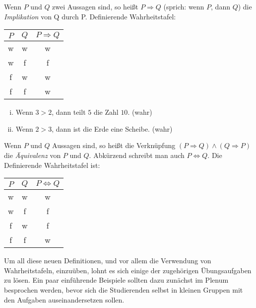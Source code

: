 \begin{mydef}
    Wenn $P$ und $Q$ zwei Aussagen sind, so heißt $P \Rightarrow Q$ (sprich: wenn $P$, dann $Q$) die \textit{Implikation} von Q durch P. 
    Definierende Wahrheitstafel: \newline
    \begin{tabular}{ c | c | c }
        $P$ & $Q$ & $P \Rightarrow Q$ \\
        \hline
        w & w & w \\
        w & f & f \\
        f & w & w \\
        f & f & w \\
    \end{tabular}
\end{mydef}

\begin{example}
    \begin{enumerate}[(i)]
        \item 
        Wenn $ 3 > 2$, dann teilt $5$ die Zahl $10$.  (wahr)
        \item 
        Wenn $2 > 3$, dann ist die Erde eine Scheibe. (wahr)
    \end{enumerate}
\end{example}

\begin{mydef}
    Wenn $P$ und $Q$ Aussagen sind, so heißt die Verknüpfung $(P \Rightarrow Q) \wedge (Q \Rightarrow P)$ die \textit{Äquivalenz} von $P$ und $Q$. 
    Abkürzend schreibt man auch $P \iff Q$. Die Definierende Wahrheitstafel ist: \newline
    \begin{tabular}{ c | c | c }
        $P$ & $Q$ & $P \iff Q$ \\
        \hline
        w & w & w \\
        w & f & f \\
        f & w & f \\
        f & f & w \\
    \end{tabular}
\end{mydef}

Um all diese neuen Definitionen, und vor allem die Verwendung von Wahrheitstafeln,
einzuüben, lohnt es sich einige der zugehörigen Übungsaufgaben zu lösen.  Ein paar einführende Beispiele 
sollten dazu zunächst im Plenum besprochen werden, bevor sich die Studierenden selbst in kleinen Gruppen 
mit den Aufgaben auseinandersetzen sollen. 
